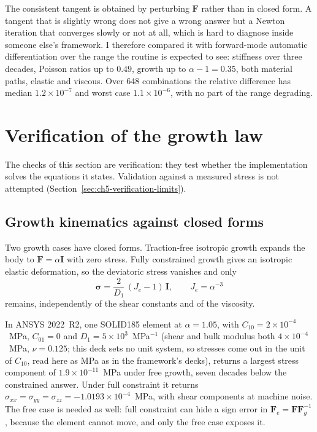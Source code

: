 The consistent tangent is obtained by perturbing $\mathbf F$ rather than in
closed form. A tangent that is slightly wrong does not give a wrong answer but
a Newton iteration that converges slowly or not at all, which is hard to
diagnose inside someone else's framework. I therefore compared it with
forward-mode automatic differentiation over the range the routine is expected
to see: stiffness over three decades, Poisson ratios up to $0.49$, growth up to
$\alpha-1=0.35$, both material paths, elastic and viscous. Over 648 combinations
the relative difference has median $1.2\times10^{-7}$ and worst case
$1.1\times10^{-6}$, with no part of the range degrading.

\section{Verification of the growth law}
\label{sec:ch5-verification}

The checks of this section are verification: they test whether the
implementation solves the equations it states. Validation against a measured
stress is not attempted (Section~\ref{sec:ch5-verification-limits}).

\subsection{Growth kinematics against closed forms}
Two growth cases have closed forms. Traction-free isotropic growth expands the
body to $\mathbf F=\alpha\mathbf I$ with zero stress. Fully constrained
growth gives an isotropic elastic deformation, so the deviatoric stress
vanishes and only
\begin{equation}
  \bm\sigma = \frac{2}{D_1}\,(J_e-1)\,\mathbf I,\qquad J_e=\alpha^{-3}
  \label{eq:ch5-constrained}
\end{equation}
remains, independently of the shear constants and of the viscosity.

In ANSYS 2022~R2, one SOLID185 element at $\alpha=1.05$, with
$C_{10}=2\times10^{-4}$~MPa, $C_{01}=0$ and $D_1=5\times10^{3}$~MPa$^{-1}$
(shear and bulk modulus both $4\times10^{-4}$~MPa, $\nu=0.125$; this deck sets
no unit system, so stresses come out in the unit of $C_{10}$, read here as MPa
as in the framework's decks), returns a
largest stress component of $1.9\times10^{-11}$~MPa under free growth, seven
decades below the constrained answer. Under full constraint it returns
$\sigma_{xx}=\sigma_{yy}=\sigma_{zz}=-1.0193\times10^{-4}$~MPa, with shear
components at machine noise. The free case is needed as well: full constraint
can hide a sign error in $\mathbf F_e=\mathbf F\mathbf F_g^{-1}$, because the
element cannot move, and only the free case exposes it.

